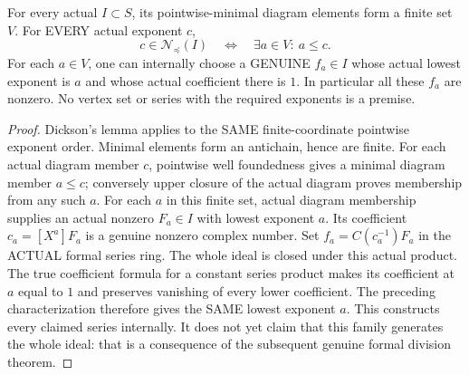 \begin{theorem}
\label{hir:actual-formal-initial-diagram-finite-monic-vertices}
For every actual $I\subset S$, its pointwise-minimal diagram elements
form a finite set $V$. For EVERY actual exponent $c$,
\[
 c\in\mathcal N_\preceq(I)\quad\Longleftrightarrow\quad
 \exists a\in V:\ a\le c.
\]
For each $a\in V$, one can internally choose a GENUINE $f_a\in I$
whose actual lowest exponent is $a$ and whose actual coefficient there
is $1$. In particular all these $f_a$ are nonzero. No vertex set or
series with the required exponents is a premise.
\leanok
\end{theorem}
\begin{proof}
Dickson's lemma applies to the SAME finite-coordinate pointwise
exponent order. Minimal elements form an antichain, hence are finite.
For each actual diagram member $c$, pointwise well foundedness gives
a minimal diagram member $a\le c$; conversely upper closure of the
actual diagram proves membership from any such $a$.
For each $a$ in this finite set, actual diagram membership supplies an
actual nonzero $F_a\in I$ with lowest exponent $a$. Its coefficient
$c_a=[X^a]F_a$ is a genuine nonzero complex number. Set
$f_a=C(c_a^{-1})F_a$ in the ACTUAL formal series ring. The whole
ideal is closed under this actual product. The true coefficient formula
for a constant series product makes its coefficient at $a$ equal to
$1$ and preserves vanishing of every lower coefficient. The preceding
characterization therefore gives the SAME lowest exponent $a$.
This constructs every claimed series internally. It does not yet claim
that this family generates the whole ideal: that is a consequence of
the subsequent genuine formal division theorem.
\end{proof}

